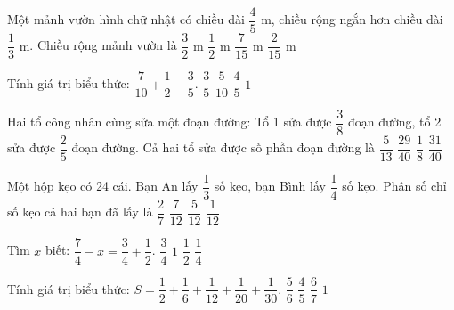 \begin{ex} %
Một mảnh vườn hình chữ nhật có chiều dài $\dfrac{4}{5}\text{ m}$, chiều rộng ngắn hơn chiều dài $\dfrac{1}{3}\text{ m}$. Chiều rộng mảnh vườn là
\choice
{$\dfrac{3}{2}\text{ m}$}
{$\dfrac{1}{2}\text{ m}$}
{\True $\dfrac{7}{15}\text{ m}$}
{$\dfrac{2}{15}\text{ m}$}
\end{ex}

\begin{ex} %
Tính giá trị biểu thức: $\dfrac{7}{10} + \dfrac{1}{2} - \dfrac{3}{5}$.
\choice
{\True $\dfrac{3}{5}$}
{$\dfrac{5}{10}$}
{$\dfrac{4}{5}$}
{$1$}
\end{ex}

\begin{ex} %
Hai tổ công nhân cùng sửa một đoạn đường: Tổ 1 sửa được $\dfrac{3}{8}$ đoạn đường, tổ 2 sửa được $\dfrac{2}{5}$ đoạn đường. Cả hai tổ sửa được số phần đoạn đường là
\choice
{$\dfrac{5}{13}$}
{$\dfrac{29}{40}$}
{$\dfrac{1}{8}$}
{\True $\dfrac{31}{40}$}
\end{ex}

\begin{ex} %
Một hộp kẹo có 24 cái. Bạn An lấy $\dfrac{1}{3}$ số kẹo, bạn Bình lấy $\dfrac{1}{4}$ số kẹo. Phân số chỉ số kẹo cả hai bạn đã lấy là
\choice
{$\dfrac{2}{7}$}
{\True $\dfrac{7}{12}$}
{$\dfrac{5}{12}$}
{$\dfrac{1}{12}$}
\end{ex}

\begin{ex} %
Tìm $x$ biết: $\dfrac{7}{4} - x = \dfrac{3}{4} + \dfrac{1}{2}$.
\choice
{$\dfrac{3}{4}$}
{$1$}
{\True $\dfrac{1}{2}$}
{$\dfrac{1}{4}$}
\end{ex}

\begin{ex} %
Tính giá trị biểu thức: $S = \dfrac{1}{2} + \dfrac{1}{6} + \dfrac{1}{12} + \dfrac{1}{20} + \dfrac{1}{30}$.
\choice
{\True $\dfrac{5}{6}$}
{$\dfrac{4}{5}$}
{$\dfrac{6}{7}$}
{$1$}
\end{ex}

